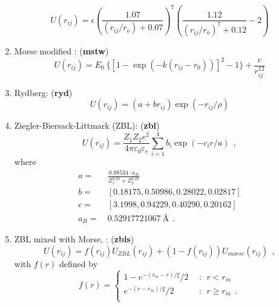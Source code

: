 \begin{enumerate}
\begin{equation}
U(r_{ij}) = \epsilon\left(\frac{1.07}{(r_{ij}/r_{o})+0.07}\right)^{7}\left(\frac{1.12}{(r_{ij}/r_{o})^{7}+0.12}-2\right)
\end{equation}
\item Morse modified \cite{pedone2006}: ({\bf mstw})
  \begin{equation}
    U\left(r_{ij}\right) = E_{0}~\{\left[1-\exp\left(-k\left(r_{ij}-r_{0}\right)\right)\right]^{2}-1\}+\frac{c}{r_{ij}^{12}}
  \end{equation}
\item Rydberg: ({\bf ryd})
  \begin{equation}
    U\left(r_{ij}\right) = \left(a+br_{ij}\right)\exp\left(-r_{ij}/\rho\right)
  \end{equation}
\item Ziegler-Biersack-Littmark (ZBL): \cite{ziegler1985} ({\bf zbl})
  \begin{equation}
      U(r_{ij}) = \frac{Z_{1} Z_{2}e^{2}}{4 \pi \varepsilon_{0} \varepsilon_{r}}
                  \sum_{i=1}^{4} b_{i} \exp\left(-c_{i}r/a\right)~~,
  \end{equation}
  where
  \begin{equation}
    \begin{split}
      a=&~\frac{0.88534 \cdot a_{B}}{Z_{1}^{0.23}+Z_{2}^{0.23}} \\
      b=&~[0.18175,0.50986,0.28022,0.02817] \\
      c=&~[3.1998,0.94229,0.40290,0.20162] \\
  a_{B}=&~ 0.52917721067~\textrm{\AA}~~. \nonumber
    \end{split}
  \end{equation}
\item ZBL mixed with Morse, \cite{trachenko2003}: ({\bf zbls})
  \begin{equation}
    U\left(r_{ij}\right) = f\left(r_{ij}\right)U_{ZBL}\left(r_{ij}\right)+\left(1-f\left(r_{ij}\right)\right)U_{morse}\left(r_{ij}\right)~~,
  \end{equation}
  with $f\left(r\right)$ defined by
  \begin{equation*}
     f\left(r\right) = \left\{
       \begin{array}{ll}
         1-e^{-\left(r_m-r\right)/\xi}/2 & ~~:~~ r<r_m \\
         e^{-\left(r-r_m\right)/\xi}/2 & ~~:~~ r\geq r_m~~. \\
       \end{array}
       \right.
  \end{equation*}


\end{enumerate}
